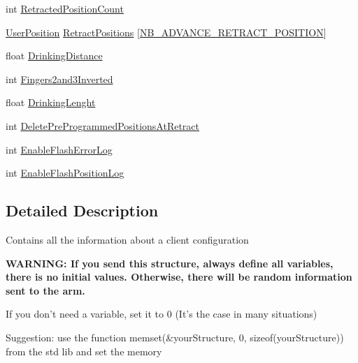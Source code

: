 \begin{DoxyCompactItemize}
\item 
int \hyperlink{struct_client_configurations_a4058c290c5bac0504e511f0f50e5914b}{Retracted\-Position\-Count}
\item 
\hyperlink{struct_user_position}{User\-Position} \hyperlink{struct_client_configurations_aaebc19d45af665f9db9322d74021ec22}{Retract\-Positions} \mbox{[}\hyperlink{_kinova_types_8h_a663862aeb115e7f11080df128498e924}{N\-B\-\_\-\-A\-D\-V\-A\-N\-C\-E\-\_\-\-R\-E\-T\-R\-A\-C\-T\-\_\-\-P\-O\-S\-I\-T\-I\-O\-N}\mbox{]}
\item 
float \hyperlink{struct_client_configurations_a494c5a866ae44191aafdc66ab69033c3}{Drinking\-Distance}
\item 
int \hyperlink{struct_client_configurations_a55cb748c864cd65d8136da316b46df61}{Fingers2and3\-Inverted}
\item 
float \hyperlink{struct_client_configurations_a1029013b8d5d2d9ea902ab628c98a7e0}{Drinking\-Lenght}
\item 
int \hyperlink{struct_client_configurations_ab0dca6d6259625fafd1c725533337460}{Delete\-Pre\-Programmed\-Positions\-At\-Retract}
\item 
int \hyperlink{struct_client_configurations_a16b087061d560a4f185e779352d6e2e3}{Enable\-Flash\-Error\-Log}
\item 
int \hyperlink{struct_client_configurations_ae0c7b4d0a3f91271e8138985807be8c6}{Enable\-Flash\-Position\-Log}
\end{DoxyCompactItemize}


\subsection{Detailed Description}
\par
Contains all the information about a client configuration \par
{\bfseries W\-A\-R\-N\-I\-N\-G\-: If you send this structure, always define all variables, there is no initial values. Otherwise, there will be random information sent to the arm.} \par
If you don't need a variable, set it to 0 (It's the case in many situations) \par
Suggestion\-: use the function memset(\&your\-Structure, 0, sizeof(your\-Structure)) from the std lib and set the memory 



